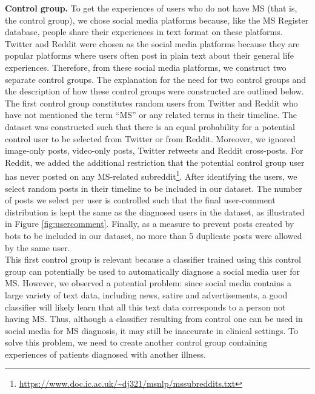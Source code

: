 \documentclass[11pt,a4paper]{article}
\begin{document}
\indent \textbf{Control group.} To get the experiences of users who do not have MS (that is, the control group), we chose social media platforms because, like the MS Register database, people share their experiences in text format on these platforms. Twitter and Reddit were chosen as the social media platforms because they are popular platforms where users often post in plain text about their general life experiences. Therefore, from these social media platforms, we construct two separate control groups. The explanation for the need for two control groups and the description of how these control groups were constructed are outlined below. \\
\indent The first control group constitutes random users from Twitter and Reddit who have not mentioned the term “MS” or any related terms in their timeline. The dataset was constructed such that there is an equal probability for a potential control user to be selected from Twitter or from Reddit. Moreover, we ignored image-only posts, video-only posts, Twitter retweets and Reddit cross-posts. For Reddit, we added the additional restriction that the potential control group user has never posted on any MS-related subreddit\footnote{\url{https://www.doc.ic.ac.uk/~dj321/msnlp/mssubreddits.txt}}. After identifying the users, we select random posts in their timeline to be included in our dataset. The number of posts we select per user is controlled such that the final user-comment distribution is kept the same as the diagnosed users in the dataset, as illustrated in Figure \ref{fig:usercomment}. Finally, as a measure to prevent posts created by bots to be included in our dataset, no more than 5 duplicate posts were allowed by the same user. \\
\indent This first control group is relevant because a classifier trained using this control group can potentially be used to automatically diagnose a social media user for MS. However, we observed a potential problem: since social media contains a large variety of text data, including news, satire and advertisements, a good classifier will likely learn that all this text data corresponds to a person not having MS. Thus, although a classifier resulting from control one can be used in social media for MS diagnosis, it may still be inaccurate in clinical settings. To solve this problem, we need to create another control group containing experiences of patients diagnosed with another illness. \\
\end{document}
